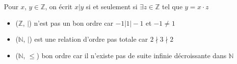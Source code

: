 \begin{example}
	Pour $x$, $y \in \mathbb{Z}$, on écrit $x | y$ si et seulement si $\exists z \in \mathbb{Z}$ tel que $y = x\cdot z$
	\begin{itemize}
		\item ($\mathbb{Z}$, $|$) n'est pas un bon ordre car $-1 | 1 | -1$ et $-1 \neq 1$
		\item ($\mathbb{N}$, $|$) est une relation d'ordre pas totale car $2 \nmid 3 \nmid 2$
		\item ($\mathbb{N}$, $\leqslant$) bon ordre car il n'existe pas de suite infinie décroissante dans $\mathbb{N}$
	\end{itemize}
\end{example}
